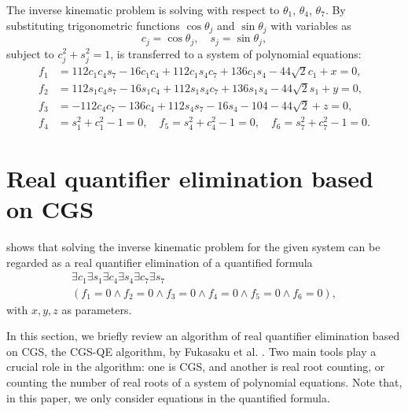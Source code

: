 \documentclass{birkjour}
\theoremstyle{plain}
\theoremstyle{definition}
\begin{document}
    The inverse kinematic problem is solving  with respect to 
    $\theta_1$, $\theta_4$, $\theta_7$. 
    By substituting trigonometric functions $\cos\theta_j$ and $\sin\theta_j$ with variables as
    \[
    c_j=\cos\theta_j,\quad s_j=\sin\theta_j,
    \]
    subject to $c_j^2+s_j^2=1$,  is transferred to a system of 
    polynomial equations:
    \begin{equation}
        \label{eq:inverse-kinematic-equations}
        \begin{split}
            f_1 &= 112c_1c_4s_7-16c_1c_4+112c_1s_4c_7+136c_1s_4-44{\sqrt{2}}c_1 + x = 0, \\
            f_2 &= 112s_1c_4s_7-16s_1c_4+112s_1s_4c_7+136s_1s_4-44{\sqrt{2}}s_1 + y = 0, \\
            f_3 &= -112c_4c_7-136c_4+112s_4s_7-16s_4-104-44{\sqrt{2}} + z = 0, \\
            f_4 &= s_1^2+c_1^2-1=0, \quad
            f_5 = s_4^2+c_4^2-1=0, \quad
            f_6 = s_7^2+c_7^2-1=0.
        \end{split}
    \end{equation}

    \section{Real quantifier elimination based on CGS}
    \label{sec:cgs-qe}

     shows that solving the inverse kinematic problem 
    for the given system can be regarded as a real quantifier elimination of 
    a quantified formula
    \begin{multline}
        \label{eq:inverse-kinematic-qe-formula}
        \exists{c_1}\exists{s_1}\exists{c_4}\exists{s_4}\exists{c_7}
        \exists{s_7} \\
        (f_1=0 \land f_2=0 \land f_3=0 \land f_4=0 \land f_5=0 \land f_6=0),
    \end{multline}
    with $x,y,z$ as parameters.

    In this section, we briefly review an algorithm of real quantifier elimination 
    based on CGS, the CGS-QE algorithm,
    by Fukasaku et al. \cite{fuk-iwa-sat2015}.
    Two main tools play a crucial role in the algorithm: one is CGS, 
    and another is real root counting, or counting the number of real roots of a system of polynomial equations.
    Note that, in this paper, we only consider equations in the quantified formula. 
\end{document}
